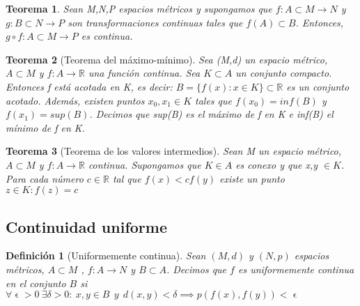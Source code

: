 \documentclass[11pt, a4paper]{article}
\let\epsilon\upvarepsilon
\newcommand{\R}{\mathbb{R}}
\theoremstyle{theorem-style}
\newtheorem*{nth}{Teorema}
\theoremstyle{definition-style}
\newtheorem*{ndef}{Definición}
\theoremstyle{remark-style}
\theoremstyle{example-style}
\begin{document}
\begin{nth}
	Sean M,N,P espacios métricos y supongamos que $f:A\subset M \to N$ y $g: B \subset N \to P$ son transformaciones continuas tales que $f(A) \subset B$. Entonces, $g \circ f : A \subset M \to P $ es continua.
\end{nth}

\begin{nth}[Teorema del máximo-mínimo]
	Sea (M,d) un espacio métrico, $A\subset M$ y $f:A \to \R$ una función continua. Sea $K \subset A$ un conjunto compacto. Entonces f está acotada en K, es decir: $B=\{f(x) : x \in K\}\subset \R$ es un conjunto acotado. Además, existen puntos $x_0,x_1 \in K $ tales que $f(x_0) = inf(B)$ y $f(x_1) = sup(B)$. Decimos que sup(B) es el máximo de f en K e inf(B) el mínimo de f en K.
	
\end{nth}
\begin{nth}
	[Teorema de los valores intermedios]
Sean M un espacio métrico, $A\subset M$ y $f:A \to \R$ continua. Supongamos que $K\in A$ es conexo y que x,y $\in K$. Para cada número $c \in \R$ tal que $f(x) < c f(y)$ existe un punto $z \in K : f(z) = c$
\end{nth}


\subsection{Continuidad uniforme}

\begin{ndef}[Uniformemente continua]
	Sean $(M,d)$ y $(N,p)$ espacios métricos, $A \subset M$ , $f:A \to N$ y $B \subset A$. Decimos que $f$ es uniformemente continua en el conjunto $B$ si $\forall \epsilon > 0 \ \exists \delta > 0 :  \ x,y \in B \ \ y \ \ d(x,y) < \delta \implies p(f(x),f(y)) < \epsilon$
\end{ndef}
\end{document}
